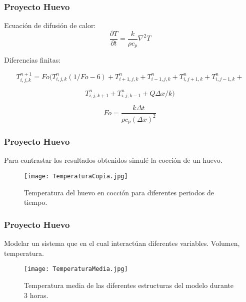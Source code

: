 \documentclass[11pt]{beamer}
\begin{document}
\begin{frame}
	\frametitle{Proyecto Huevo}
	
	Ecuación de difusión de calor:
	\begin{equation}
		\frac{\partial T}{\partial t} = \frac{k}{\rho c_p} \nabla^2 T
	\end{equation}
	
	Diferencias finitas:

	
	\begin{equation*}
		T^{n+1}_{i,j,k} = Fo(T^{n}_{i,j,k}(1/Fo -6)+T^{n}_{i+1,j,k}+T^{n}_{i-1,j,k}+T^{n}_{i,j+1,k}+T^{n}_{i,j-1,k}+
	
	\end{equation*}

	\begin{equation*}
		T^{n}_{i,j,k+1}+T^{n}_{i,j,k-1} + Q  \Delta x/k) 
	\end{equation*}

		\begin{equation}
			Fo = \frac{k\Delta t}{\rho c_p (\Delta x)^2}
	\end{equation}
	
	
\end{frame}
	
	


	\begin{frame}
	\frametitle{Proyecto Huevo}
	
	Para contrastar los resultados obtenidos simulé la cocción de un huevo.
	
		\begin{figure}
		\centering
		\texttt{[image: TemperaturaCopia.jpg]}
		\caption{Temperatura del huevo en cocción para diferentes periodos de tiempo.}
	\end{figure}
	
	
	
\end{frame}



	\begin{frame}
		\frametitle{Proyecto Huevo}
		Modelar un sistema que en el cual interactúan diferentes variables. Volumen, temperatura.
		
	\begin{figure}
	\centering
	\texttt{[image: TemperaturaMedia.jpg]}
	\caption{Temperatura media de las diferentes estructuras del modelo durante 3 horas.}
\end{figure}
	
	\end{frame}
\end{document}
